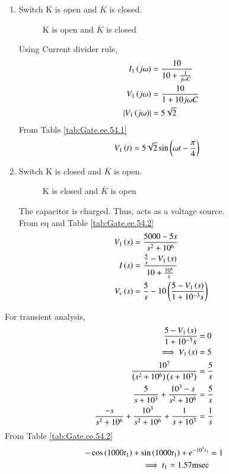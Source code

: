 \documentclass[journal,12pt,twocolumn]{IEEEtran}
\begin{document}
\solution
\begin{enumerate}
\item Switch K is open and $\overline{K}$ is closed.
\begin{figure}[ht]
  \centering
  \begin{adjustbox}{width=\columnwidth}
      
  \end{adjustbox}
  \caption{K is open and $\overline{K}$ is closed}
\end{figure}

Using Current divider rule,
\begin{align}
   I_1\left(j\omega\right) &= \frac{10}{10+\frac{1}{j\omega C}}\\
   V_1\left(j\omega\right) &= \frac{10}{1+10j\omega C}\\
   \left\vert V_1\left(j\omega\right)\right\vert &= 5\sqrt{2}
 \end{align}
 From Table \ref{tab:Gate.ee.54.1}
 \begin{align}
   V_1\left(t\right) &= 5\sqrt{2}\sin\left(\omega t - \frac{\pi}{4}\right) \label{eq:1.gate.ee.23.54}
\end{align}


\item Switch K is closed and $\overline{K}$ is open.

\begin{figure}[ht]
  \centering
  \begin{adjustbox}{width=\columnwidth}
      
  \end{adjustbox}
  \caption{K is closed and $\overline{K}$ is open}
\end{figure}


The capacitor is charged. Thus, acts as a voltage source.\\
From eq\brak{\ref{eq:1.gate.ee.23.54}} and Table \ref{tab:Gate.ee.54.2}
\begin{align}
    V_1\left(s\right) &= \frac{5000 - 5s}{s^2 + 10^6} \\
    I\left(s\right) &= \frac{\frac{5}{s} - V_1\left(s\right)}{10 + \frac{10^4}{s}}\\
    V_c\left(s\right) &= \frac{5}{s} - 10\left(\frac{5-V_1\left(s\right)}{1+10^{-3}s}\right)
\end{align}
\end{enumerate}

For transient analysis,
\begin{align}
    \frac{5-V_1\left(s\right)}{1+10^{-3}s} &= 0\\
    \implies V_1\left(s\right) &= 5\\
    \frac{10^7}{\left(s^2+10^6\right)\left(s+10^3\right)} &= \frac{5}{s}\\
    \frac{5}{s+10^3} + \frac{10^3-s}{s^2 + 10^6} &= \frac{5}{s}\\
    \frac{-s}{s^2+10^6} + \frac{10^3}{s^2 + 10^6} + \frac{1}{s+10^3} &= \frac{1}{s}
\end{align}
From Table \ref{tab:Gate.ee.54.2}
\begin{align}
    -\cos\left(1000t_1\right)+\sin\left(1000t_1\right)+e^{-10^3 t_1} &= 1\\
    \implies t_1 \approx 1.57\text{msec}
\end{align}
\end{document}
